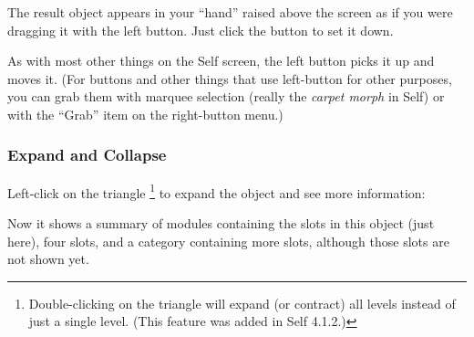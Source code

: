 \documentclass[letterpaper,10pt,english]{sphinxmanual}
\begin{document}
The result object appears in your “hand” raised above the screen as if you were dragging it with the
left button. Just click the button to set it down.
\begin{figure}[htbp]\begin{flushleft}

\end{flushleft}\end{figure}

As with most other things on the Self screen, the left button picks it up and moves it. (For buttons
and other things that use left-button for other purposes, you can grab them with marquee selection
(really the \emph{carpet morph} in Self) or with the “Grab” item on the right-button menu.)


\subsubsection{Expand and Collapse}
\label{howtoprg:expand-and-collapse}
Left-click on the triangle \footnote{
Double-clicking on the triangle will expand (or contract) all levels instead of just a single level. (This feature was added in Self 4.1.2.)
} to expand the object and see more information:
\begin{figure}[htbp]\begin{flushleft}

\end{flushleft}\end{figure}

Now it shows a summary of modules containing the slots in this object (just 
here), four slots, and a category containing more slots, although those slots are not shown
yet.
\end{document}
